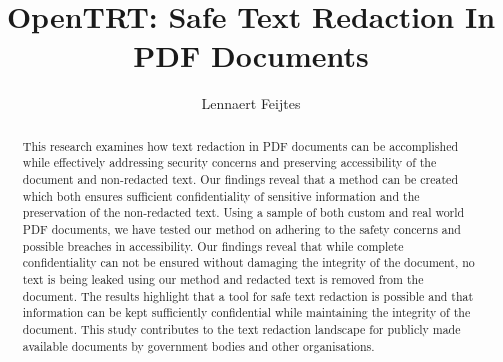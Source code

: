 \documentclass[twoside]{uva-inf-bachelor-thesis}
\title{OpenTRT: Safe Text Redaction In PDF Documents}
\author{Lennaert Feijtes}
\begin{document}
\maketitle

\begin{abstract}

This research examines how text redaction in PDF documents can be accomplished while effectively addressing security concerns and preserving accessibility of the document and non-redacted text. Our findings reveal that a method can be created which both ensures sufficient confidentiality of sensitive information and the preservation of the non-redacted text. Using a sample of both custom and real world PDF documents, we have tested our method on adhering to the safety concerns and possible breaches in accessibility. Our findings reveal that while complete confidentiality can not be ensured without damaging the integrity of the document, no text is being leaked using our method and redacted text is removed from the document. The results highlight that a tool for safe text redaction is possible and that information can be kept sufficiently confidential while maintaining the integrity of the document. This study contributes to the text redaction landscape for publicly made available documents by government bodies and other organisations.
\end{abstract}

\tableofcontents














\end{document}
